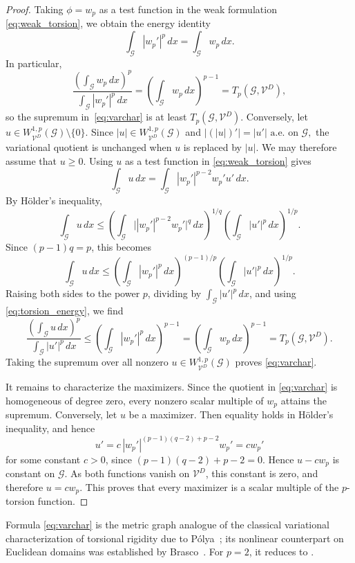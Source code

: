 \documentclass[12pt,a4paper]{article}
\numberwithin{equation}{section}
\newcommand{\WpD}{W^{1,p}_{\mathcal{V}^D}(\mathcal G)}
\begin{document}
\begin{proof}
	Taking $\phi=w_p$ as a test function in the weak formulation
	\eqref{eq:weak_torsion}, we obtain the energy identity
	\begin{equation}
		\label{eq:torsion_energy}
		\int_{\mathcal G}|w_p'|^p\,dx
		=
		\int_{\mathcal G}w_p\,dx.
	\end{equation}
	In particular,
	\[
	\frac{\left(\int_{\mathcal G}w_p\,dx\right)^p}
	{\int_{\mathcal G}|w_p'|^p\,dx}
	=
	\left(\int_{\mathcal G}w_p\,dx\right)^{p-1}
	=
	T_p(\mathcal G,\mathcal V^D),
	\]
	so the supremum in~\eqref{eq:varchar} is at least
	$T_p(\mathcal G,\mathcal V^D)$.
	Conversely, let $u\in\WpD\setminus\{0\}$. Since
	$|u|\in\WpD$ and
	\(
	\bigl|(|u|)'\bigr|=|u'|
	\text{ a.e. on }\mathcal G,
	\)
	the variational quotient is unchanged when $u$ is replaced by $|u|$.
	We may therefore assume that $u\geq0$. Using $u$ as a test function in
	\eqref{eq:weak_torsion} gives
	\[
	\int_{\mathcal G}u\,dx
	=
	\int_{\mathcal G}|w_p'|^{p-2}w_p'u'\,dx.
	\]
	By H\"older's inequality,
	\[
	\int_{\mathcal G}u\,dx
	\leq
	\left(
	\int_{\mathcal G}
	\bigl||w_p'|^{p-2}w_p'\bigr|^q\,dx
	\right)^{1/q}
	\left(
	\int_{\mathcal G}|u'|^p\,dx
	\right)^{1/p}.
	\]
	Since $(p-1)q=p$, this becomes
	\[
	\int_{\mathcal G}u\,dx
	\leq
	\left(
	\int_{\mathcal G}|w_p'|^p\,dx
	\right)^{(p-1)/p}
	\left(
	\int_{\mathcal G}|u'|^p\,dx
	\right)^{1/p}.
	\]
	Raising both sides to the power $p$, dividing by
	$\int_{\mathcal G}|u'|^p\,dx$, and using
	\eqref{eq:torsion_energy}, we find
	\[
	\frac{\left(\int_{\mathcal G}u\,dx\right)^p}
	{\int_{\mathcal G}|u'|^p\,dx}
	\leq
	\left(
	\int_{\mathcal G}|w_p'|^p\,dx
	\right)^{p-1}
	=
	\left(
	\int_{\mathcal G}w_p\,dx
	\right)^{p-1}
	=
	T_p(\mathcal G,\mathcal V^D).
	\]
	Taking the supremum over all nonzero $u\in\WpD$ proves
	\eqref{eq:varchar}.
	
	It remains to characterize the maximizers. Since the quotient in
	\eqref{eq:varchar} is homogeneous of degree zero, every nonzero scalar
	multiple of $w_p$ attains the supremum.
Conversely, let $u$ be a maximizer. Then equality holds in Hölder's
inequality, and hence
\[
u'
=
c\,|w_p'|^{(p-1)(q-2)+p-2}w_p'
=
cw_p'
\]
for some constant $c>0$, since $(p-1)(q-2)+p-2=0$.
Hence $u-cw_p$ is constant on $\mathcal G$. As both functions vanish on
$\mathcal V^D$, this constant is zero, and therefore
\(
u=cw_p.
\)
This proves that every maximizer is a scalar multiple of the
$p$-torsion function.
\end{proof}


Formula \eqref{eq:varchar} is the metric graph analogue of the classical
variational characterization of torsional rigidity due to
P\'olya~\cite{Polya}; its nonlinear counterpart on Euclidean domains was
established by Brasco~\cite{Brasco}. For $p=2$, it reduces to
\cite[Eq.~(2.4)]{MuPl}.
\end{document}
